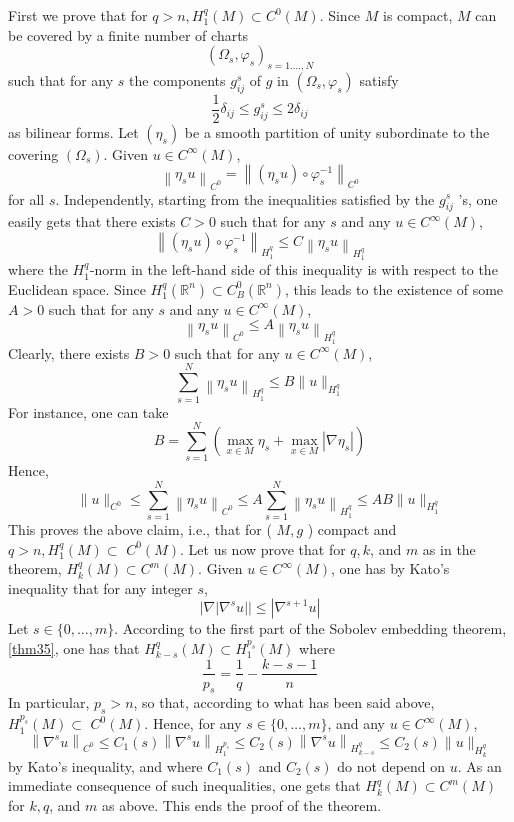 \documentclass[12pt,hyperref,a4paper,UTF8]{ctexart}
\begin{document}
\begin{Proof}
First we prove that for $q>n, H_1^q(M) \subset C^0(M)$. Since $M$ is compact, $M$ can be covered by a finite number of charts
$$
\left(\Omega_s, \varphi_s\right)_{s=1 \ldots ., N}
$$
such that for any $s$ the components $g_{i j}^s$ of $g$ in $\left(\Omega_s, \varphi_s\right)$ satisfy
$$
\frac{1}{2} \delta_{i j} \leq g_{i j}^s \leq 2 \delta_{i j}
$$
as bilinear forms. Let $\left(\eta_s\right)$ be a smooth partition of unity subordinate to the covering $\left(\Omega_s\right)$. Given $u \in C^{\infty}(M)$,
$$
\left\|\eta_s u\right\|_{C^0}=\left\|\left(\eta_s u\right) \circ \varphi_s^{-1}\right\|_{C^0}
$$
for all $s$. Independently, starting from the inequalities satisfied by the $g_{i j}^s$ 's, one easily gets that there exists $C>0$ such that for any $s$ and any $u \in C^{\infty}(M)$,
$$
\left\|\left(\eta_s u\right) \circ \varphi_s^{-1}\right\|_{H_1^q} \leq C\left\|\eta_s u\right\|_{H_1^q}
$$
where the $H_1^q$-norm in the left-hand side of this inequality is with respect to the Euclidean space. Since $H_1^q\left(\mathbb{R}^n\right) \subset C_B^0\left(\mathbb{R}^n\right)$, this leads to the existence of some $A>0$ such that for any $s$ and any $u \in C^{\infty}(M)$,
$$
\left\|\eta_s u\right\|_{C^0} \leq A\left\|\eta_s u\right\|_{H_1^q}
$$
Clearly, there exists $B>0$ such that for any $u \in C^{\infty}(M)$,
$$
\sum_{s=1}^N\left\|\eta_s u\right\|_{H_1^q} \leq B\|u\|_{H_1^q}
$$
For instance, one can take
$$
B=\sum_{s=1}^N\left(\max _{x \in M} \eta_s+\max _{x \in M}\left|\nabla \eta_s\right|\right)
$$
Hence,
$$
\|u\|_{C^0} \leq \sum_{s=1}^N\left\|\eta_s u\right\|_{C^0} \leq A \sum_{s=1}^N\left\|\eta_s u\right\|_{H_1^q} \leq A B\|u\|_{H_1^q}
$$
This proves the above claim, i.e., that for ( $M, g$ ) compact and $q>n, H_1^q(M) \subset$ $C^0(M)$. Let us now prove that for $q, k$, and $m$ as in the theorem, $H_k^q(M) \subset C^m(M)$. Given $u \in C^{\infty}(M)$, one has by Kato's inequality that for any integer $s$,
$$
|\nabla| \nabla^s u|| \leq\left|\nabla^{s+1} u\right|
$$
Let $s \in\{0, \ldots, m\}$. According to the first part of the Sobolev embedding theorem, \autoref{thm35}, one has that $H_{k-s}^q(M) \subset H_1^{p_s}(M)$ where
$$
\frac{1}{p_s}=\frac{1}{q}-\frac{k-s-1}{n}
$$
In particular, $p_s>n$, so that, according to what has been said above, $H_1^{p_s}(M) \subset$ $C^0(M)$. Hence, for any $s \in\{0, \ldots, m\}$, and any $u \in C^{\infty}(M)$,
$$
\left\|\nabla^s u\right\|_{C^0} \leq C_1(s)\left\|\nabla^s u\right\|_{H_1^{p_s}} \leq C_2(s)\left\|\nabla^s u\right\|_{H_{k-s}^q} \leq C_2(s)\|u\|_{H_k^q}
$$
by Kato's inequality, and where $C_1(s)$ and $C_2(s)$ do not depend on $u$. As an immediate consequence of such inequalities, one gets that $H_k^q(M) \subset C^m(M)$ for $k, q$, and $m$ as above. This ends the proof of the theorem.
\end{Proof}
\end{document}
